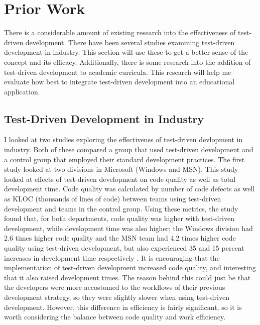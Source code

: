 \documentclass[10pt,twocolumn]{article}
\begin{document}
\section{Prior Work}

There is a considerable amount of existing research into the effectiveness of test-driven development. There have been 
several studies examining test-driven development in industry. This section will use these to get a better sense of the 
concept and its efficacy. Additionally, there is some research into the addition of test-driven development to 
academic curricula. This research will help me evaluate how best to integrate test-driven development into an 
educational application. 

\subsection{Test-Driven Development in Industry}

I looked at two studies exploring the effectivenss of test-driven devlopment in industry. Both of these compared a group 
that used test-driven development and a control group that employed their standard development practices. The first 
study looked at two divisions in Microsoft (Windows and MSN). This study looked at effects of test-driven development on 
code quality as well as total development time. Code quality was calculated by number of code defects as well as 
KLOC (thousands of lines of code) between teams using test-driven development and teams in the control group. 
Using these metrics, the study found that, for both departments, code quality was higher with test-driven development, 
while development time was also higher; the Windows division had 2.6 times higher code quality and the MSN team had 4.2 
times higher code quality using test-driven development, but also experienced 35 and 15 percent increases in development 
time respectively \cite{Bhat2006Article}. It is encouraging that the implementation of test-driven development increased 
code quality, and interesting that it also raised development times. The reason behind this could just be that the 
developers were more accostomed to the workflows of their previous development strategy, so they were slightly slower 
when using test-driven development. However, this difference in efficiency is fairly significant, so it is worth 
considering the balance between code quality and work efficiency. 
\end{document}
